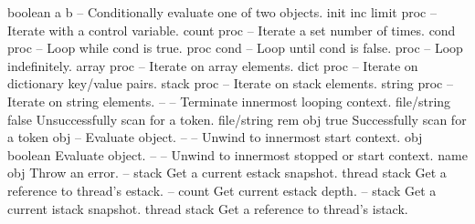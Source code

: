 \begin{longtable}{}
	{boolean a b}
	{{\bf {}}}
	{--}
	{Conditionally evaluate one of two objects.}
\hline
\optableent
	{init inc limit proc}
	{{\bf {}}}
	{--}
	{Iterate with a control variable.}
\hline
\optableent
	{count proc}
	{{\bf {}}}
	{--}
	{Iterate a set number of times.}
\hline
\optableent
	{cond proc}
	{{\bf {}}}
	{--}
	{ Loop while cond is true.}
\hline
\optableent
	{proc cond}
	{{\bf {}}}
	{--}
	{ Loop until cond is false.}
\hline
\optableent
	{proc}
	{{\bf {}}}
	{--}
	{ Loop indefinitely.}
\hline
\optableent
	{array proc}
	{{\bf {}}}
	{--}
	{Iterate on array elements.}
\optableent
	{dict proc}
	{{\bf {}}}
	{--}
	{Iterate on dictionary key/value pairs.}
\optableent
	{stack proc}
	{{\bf {}}}
	{--}
	{Iterate on stack elements.}
\optableent
	{string proc}
	{{\bf {}}}
	{--}
	{Iterate on string elements.}
\hline
\optableent
	{--}
	{{\bf {}}}
	{--}
	{Terminate innermost looping context.}
\hline
\optableent
	{file/string}
	{{\bf {}}}
	{false}
	{Unsuccessfully scan for a token.}
\optableent
	{file/string}
	{{\bf {}}}
	{rem obj true}
	{Successfully scan for a token}
\hline
\optableent
	{obj}
	{{\bf {}}}
	{--}
	{Evaluate object.}
\hline
\optableent
	{--}
	{{\bf {}}}
	{--}
	{Unwind to innermost start context.}
\hline
\optableent
	{obj}
	{{\bf {}}}
	{boolean}
	{Evaluate object.}
\hline
\optableent
	{--}
	{{\bf {}}}
	{--}
	{Unwind to innermost stopped or start context.}
\hline
\optableent
	{name}
	{{\bf {}}}
	{obj}
	{Throw an error.}
\hline
\optableent
	{--}
	{{\bf {}}}
	{stack}
	{Get a current estack snapshot.}
\hline
\optableent
	{thread}
	{{\bf {}}}
	{stack}
	{Get a reference to thread's estack.}
\hline
\optableent
	{--}
	{{\bf {}}}
	{count}
	{Get current estack depth.}
\hline
\optableent
	{--}
	{{\bf {}}}
	{stack}
	{Get a current istack snapshot.}
\hline
\optableent
	{thread}
	{{\bf {}}}
	{stack}
	{Get a reference to thread's istack.}

\end{longtable}
